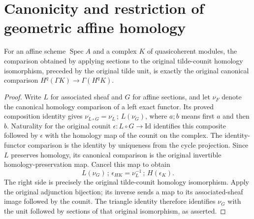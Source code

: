 \section{Canonicity and restriction of geometric affine homology}

\begin{lemma}
\label{lem:cartier-geometric-affine-counit-homology-canonical}
\leanok
{}
For an affine scheme $\operatorname{Spec}A$ and a complex $K$ of
quasicoherent modules, the comparison obtained by applying sections
to the original tilde-counit homology isomorphism, preceded by the
original tilde unit, is exactly the original canonical comparison
$H^q(\Gamma K)\to\Gamma(H^qK)$.
\end{lemma}
\begin{proof}
Write $L$ for associated sheaf and $G$ for affine sections, and let
$\nu_F$ denote the canonical homology comparison of a left exact
functor. Its proved composition identity gives
$\nu_{L\circ G}=\nu_L\,;\,L(\nu_G)$, where $a;b$ means first
$a$ and then $b$. Naturality for the original counit
$\epsilon:L\circ G\to\mathrm{Id}$ identifies this composite followed
by $\epsilon$ with the homology map of the counit on the complex.
The identity-functor comparison is the identity by uniqueness from
the cycle projection. Since $L$ preserves homology, its canonical
comparison is the original invertible homology-preservation map.
Cancel this map to obtain
\[
 L(\nu_G)\,;\,\epsilon_{H K}
 =\nu_L^{-1}\,;\,H(\epsilon_K).
\]
The right side is precisely the original tilde-counit homology
isomorphism. Apply the original adjunction bijection; its inverse
sends a map to its associated-sheaf image followed by the counit.
The triangle identity therefore identifies $\nu_G$ with the unit
followed by sections of that original isomorphism, as asserted.
\end{proof}

